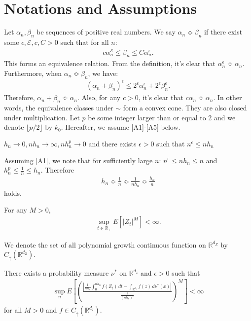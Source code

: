 \documentclass[a4paper,11pt]{jsarticle}
\begin{document}
\section{Notations and Assumptions}
Let $\alpha_n, \beta_n$ be sequences of positive real numbers. We say $\alpha_n \Bumpeq	 \beta_n$ if there exist some $\epsilon, \mathcal{E}, c, C > 0$ such that for all $n$:
\begin{align}
c\alpha_n^{\mathcal{E}} \leq \beta_n \leq C\alpha_n^\epsilon.
\end{align}
This forms an equivalence relation. From the definition, it's clear that $\alpha_n^\epsilon \Bumpeq	 \alpha_n$. Furthermore, when $\alpha_n \Bumpeq \beta_n$, we have:
\begin{align}
(\alpha_n + \beta_n)^\epsilon \leq 2^\epsilon \alpha_n^\epsilon + 2^\epsilon \beta_n^\epsilon.
\end{align}
Therefore, $\alpha_n + \beta_n\Bumpeq	 \alpha_n$. Also, for any $c > 0$, it's clear that $c\alpha_n \Bumpeq	 \alpha_n$. In other words, the equivalence classes under $\sim$ form a convex cone. They are also closed under multiplication. 
Let $ p$ be some integer larger than or equal to 2 and we denote $\lfloor p/2 \rfloor $ by $k_0$.
Hereafter, we assume [A1]-[A5] below. 
   \begin{enumerate}[label = {[{A\arabic*}]},ref=  {[{A\arabic*}]}]
    \item    $h_n \to 0,nh_n \to \infty,nh_n^p \to 0$ and there exists $\epsilon>0$ such that $n^\epsilon \leq nh_n$
\end{enumerate}
Assuming [A1], we note that for sufficiently large $n$:
$n^\epsilon \leq nh_n \leq n$ and $h_n^p \leq \frac{1}{n} \leq h_n$. Therefore
\begin{align}
h_n \Bumpeq	 \frac{1}{n}\Bumpeq	\frac{1}{nh_n}\Bumpeq	\frac{h_n}{n}
\end{align}
holds.

    \begin{enumerate}[label = {[{A\arabic*}]},ref=  {[{A\arabic*}]}]\setcounter{enumi}{1}
    \item  For any $M >0$,\begin{align}
      \sup_{t \in \mathbb{R}_+ } E[|Z_t|^M ]< \infty.
  \end{align}
\end{enumerate}
We denote the set of all polynomial growth continuous function on $\mathbb{R}^{d_Z} $ by $C_\uparrow(\mathbb{R}^{d_Z}) $.
    \begin{enumerate}[label = {[{A\arabic*}]},ref=  {[{A\arabic*}]}]\setcounter{enumi}{2}
    \item There exists a probability measure $\nu^*$ on $\mathbb{R}^{d_z} $ and $\epsilon >0$ such that \begin{align}
\sup_n     E\left[\left(\frac{\left| \frac{1}{nh_n}\int_0^{nh_n} f(Z_t) \,dt - \int_{\mathbb{R}^{d_z} } f(z) \,d\nu^*(x)\right| }{\frac{1}{(nh_n)^\epsilon }} \right)^M  \right]< \infty
\end{align}
for all $M>0$ and $f \in C_\uparrow(\mathbb{R}^{d_z}) $.
\end{enumerate}
\end{document}
